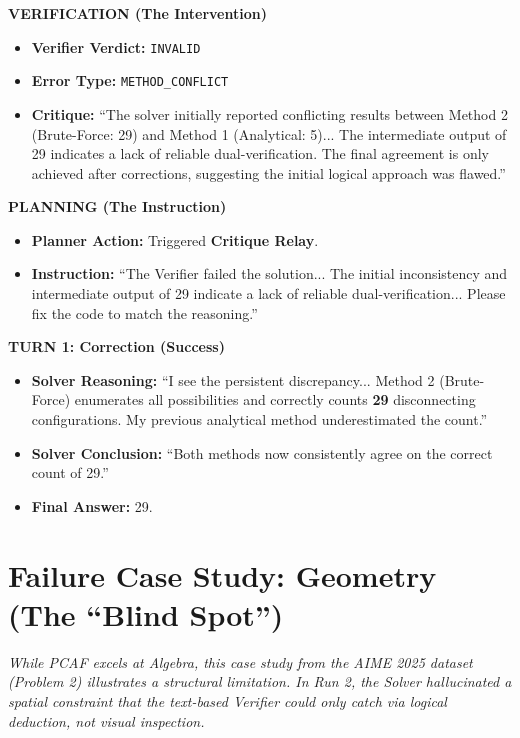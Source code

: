 \documentclass{article}
\begin{document}
\vspace{0.5em}
\textbf{VERIFICATION (The Intervention)}
\begin{itemize}
    \item \textbf{Verifier Verdict:} \texttt{INVALID}
    \item \textbf{Error Type:} \texttt{METHOD\_CONFLICT}
    \item \textbf{Critique:} ``The solver initially reported conflicting results between Method 2 (Brute-Force: 29) and Method 1 (Analytical: 5)... The intermediate output of 29 indicates a lack of reliable dual-verification. The final agreement is only achieved after corrections, suggesting the initial logical approach was flawed.''
\end{itemize}

\vspace{0.5em}
\textbf{PLANNING (The Instruction)}
\begin{itemize}
    \item \textbf{Planner Action:} Triggered \textbf{Critique Relay}.
    \item \textbf{Instruction:} ``The Verifier failed the solution... The initial inconsistency and intermediate output of 29 indicate a lack of reliable dual-verification... Please fix the code to match the reasoning.''
\end{itemize}

\vspace{0.5em}
\textbf{TURN 1: Correction (Success)}
\begin{itemize}
    \item \textbf{Solver Reasoning:} ``I see the persistent discrepancy... Method 2 (Brute-Force) enumerates all possibilities and correctly counts \textbf{29} disconnecting configurations. My previous analytical method underestimated the count.''
    \item \textbf{Solver Conclusion:} ``Both methods now consistently agree on the correct count of 29.''
    \item \textbf{Final Answer:} 29.
\end{itemize}

\section{Failure Case Study: Geometry (The ``Blind Spot'')}
\label{app:geometry_failure}

\textit{While PCAF excels at Algebra, this case study from the AIME 2025 dataset (Problem 2) illustrates a structural limitation. In Run 2, the Solver hallucinated a spatial constraint that the text-based Verifier could only catch via logical deduction, not visual inspection.}
\end{document}
